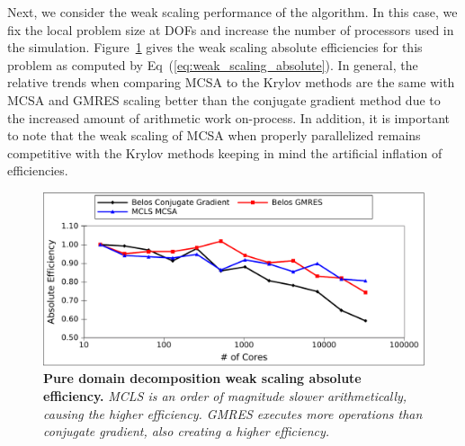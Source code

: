 Next, we consider the weak scaling performance of the algorithm. In
this case, we fix the local problem size at  DOFs and
increase the number of processors used in the
simulation. Figure~\ref{fig:titan_weak_absolute} gives the weak
scaling absolute efficiencies for this problem as computed by
Eq~(\ref{eq:weak_scaling_absolute}). In general, the relative trends
when comparing MCSA to the Krylov methods are the same with MCSA and
GMRES scaling better than the conjugate gradient method due to the
increased amount of arithmetic work on-process. In addition, it is
important to note that the weak scaling of MCSA when properly
parallelized remains competitive with the Krylov methods keeping in
mind the artificial inflation of efficiencies.

\begin{figure}[t!]
  \begin{center}
    \includegraphics[width=6in]{chapters/parallel_mc/titan_weak_absolute.pdf}
  \end{center}
  \caption{\textbf{Pure domain decomposition weak scaling absolute
      efficiency.} \textit{MCLS is an order of magnitude slower
      arithmetically, causing the higher efficiency. GMRES executes
      more operations than conjugate gradient, also creating a higher
      efficiency.}}
  \label{fig:titan_weak_absolute}
\end{figure}

